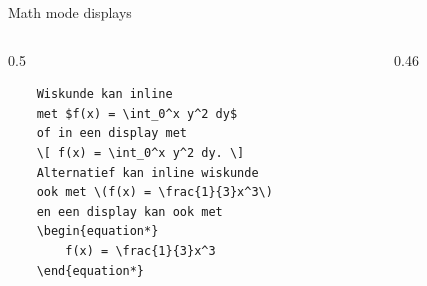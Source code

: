 \begin{frame}[fragile, t]{Math mode displays}
\begin{columns}[t]
    \begin{column}{0.5\textwidth}
    \begin{verbatim}
    Wiskunde kan inline 
    met $f(x) = \int_0^x y^2 dy$ 
    of in een display met 
    \[ f(x) = \int_0^x y^2 dy. \]
    Alternatief kan inline wiskunde 
    ook met \(f(x) = \frac{1}{3}x^3\) 
    en een display kan ook met 
    \begin{equation*}
        f(x) = \frac{1}{3}x^3
    \end{equation*}
    \end{verbatim}
    \par
\end{column}

\begin{column}{0.46\textwidth}
    \vspace{1mm}
\end{column}
\end{columns}

\end{frame}